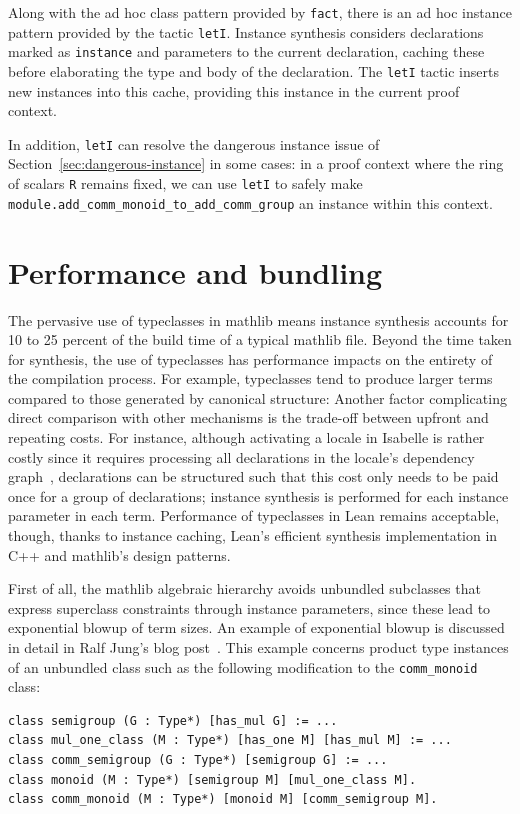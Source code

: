 \documentclass[a4paper,UKenglish,cleveref, autoref, thm-restate]{lipics-v2021}
\newcommand{\mathlib}{\textsf{mathlib}\xspace}
\begin{document}
Along with the ad hoc class pattern provided by \lstinline{fact},
there is an ad hoc instance pattern provided by the tactic \lstinline{letI}.
Instance synthesis considers declarations marked as \lstinline{instance} and parameters to the current declaration, caching these before elaborating the type and body of the declaration.
The \lstinline{letI} tactic inserts new instances into this cache,
providing this instance in the current proof context.

In addition, \lstinline{letI} can resolve the dangerous instance issue of Section~\ref{sec:dangerous-instance} in some cases:
in a proof context where the ring of scalars \lstinline{R} remains fixed, we can use \lstinline{letI} to safely make \lstinline{module.add_comm_monoid_to_add_comm_group} an instance within this context.

\section{Performance and bundling} \label{sec:performance}

The pervasive use of typeclasses in \mathlib means instance synthesis accounts for 10 to 25 percent of the build time of a typical \mathlib file. %
Beyond the time taken for synthesis, the use of typeclasses has performance impacts on the entirety of the compilation process.
For example, typeclasses tend to produce larger terms compared to those generated by canonical structure:
Another factor complicating direct comparison with other mechanisms is the trade-off between upfront and repeating costs.
For instance, although activating a locale in Isabelle is rather costly since it requires processing all declarations in the locale's dependency graph~\cite{ballarin-locales},
declarations can be structured such that this cost only needs to be paid once for a group of declarations;
instance synthesis is performed for each instance parameter in each term.
Performance of typeclasses in Lean remains acceptable, though, thanks to instance caching, Lean's efficient synthesis implementation in C++ and \mathlib's design patterns.

First of all, the \mathlib algebraic hierarchy avoids unbundled subclasses that express superclass constraints through instance parameters,
since these lead to exponential blowup of term sizes.
An example of exponential blowup is discussed in detail in Ralf Jung's blog post~\cite{unbundled-blowup}.
This example concerns product type instances of an unbundled class such as the following modification to the \lstinline{comm_monoid} class:
\begin{lstlisting}
class semigroup (G : Type*) [has_mul G] := ...
class mul_one_class (M : Type*) [has_one M] [has_mul M] := ...
class comm_semigroup (G : Type*) [semigroup G] := ...
class monoid (M : Type*) [semigroup M] [mul_one_class M].
class comm_monoid (M : Type*) [monoid M] [comm_semigroup M].
\end{lstlisting}
\end{document}
